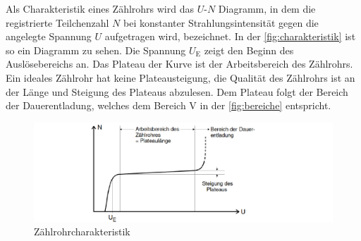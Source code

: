 Als Charakteristik eines Zählrohrs wird das $U$-$N$ Diagramm, in dem die registrierte Teilchenzahl $N$ bei konstanter Strahlungsintensität gegen die angelegte Spannung $U$ aufgetragen wird, bezeichnet.
In der \autoref{fig:charakteristik} ist so ein Diagramm zu sehen. 
Die Spannung $U_{\text{E}}$ zeigt den Beginn des Auslösebereichs an. 
Das Plateau der Kurve ist der Arbeitsbereich des Zählrohrs.
Ein ideales Zählrohr hat keine Plateausteigung, die Qualität des Zählrohrs ist an der Länge und Steigung des Plateaus abzulesen.
Dem Plateau folgt der Bereich der Dauerentladung, welches dem Bereich V in der \autoref{fig:bereiche} entspricht.
\begin{figure}
    \centering
    \includegraphics[width=\textwidth]{content/charakteristik.pdf}
    \caption{Zählrohrcharakteristik \cite{anleitung}}
    \label{fig:charakteristik}
\end{figure}